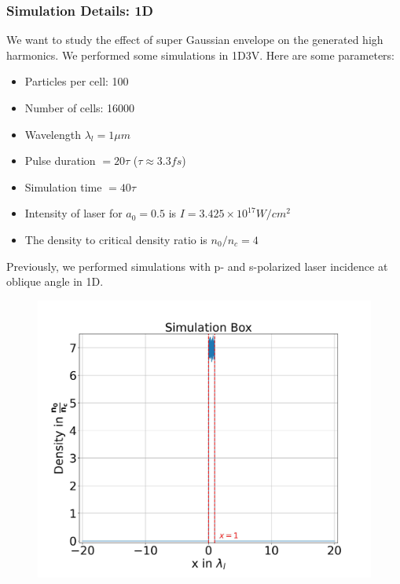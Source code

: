 \documentclass{beamer}
\begin{document}
\begin{frame}
    \frametitle{Simulation Details: 1D}
    \small
    We want to study the effect of super Gaussian envelope on the generated high harmonics. We performed some simulations in 1D3V. Here are some parameters:

    \begin{minipage}[t]{0.48\linewidth}
        \begin{itemize}
            \item Particles per cell: 100
            \item Number of cells: 16000
            \item Wavelength $\lambda_l = 1 \mu m$
            \item Pulse duration $= 20 \tau$ ($\tau\approx 3.3 fs$)
            \item Simulation time $= 40 \tau$
            \item Intensity of laser for $a_0 = 0.5$ is $I = 3.425 \times 10^{17} W/cm^2$
            \item The density to critical density ratio is $n_0/n_c = 4$
        \end{itemize}
        Previously, we performed simulations with p- and s-polarized laser incidence at oblique angle in 1D.
    \end{minipage}
    \begin{minipage}[t]{0.48\linewidth}
        \begin{figure}
            \centering
            \includegraphics[width=1.0\textwidth, height=0.62\textheight]{images/plasma.jpg}
            \label{fig:plasma}
        \end{figure}
    \end{minipage}
\end{frame}
\end{document}
